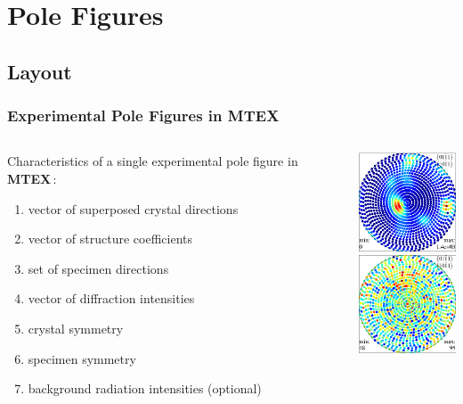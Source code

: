 \documentclass{beamer}
\newcommand{\mtex}{{\large \bf{\color{red}M}TEX\,}}%
\newcommand{\MTEX}{{\bf {\color{red}M}TEX\,}}%
\begin{document}
\section{Pole Figures}

\subsection*{Layout}

\begin{frame}[fragile]
  \frametitle{Experimental Pole Figures in \MTEX}

  \begin{columns}

    \begin{column}{8.2cm}

      Characteristics of a single experimental pole figure in \mtex:
      \begin{enumerate}
      \item vector of superposed crystal directions
      \item vector of structure coefficients
      \item set of specimen directions
      \item vector of diffraction intensities
      \item crystal symmetry
      \item specimen symmetry
      \item background radiation intensities (optional)
      \end{enumerate}

    \end{column}

    \begin{column}{3cm}
      \includegraphics[width=3cm]{pic/pf1}\\
      \includegraphics[width=3cm]{pic/pfso9_bg}
    \end{column}


  \end{columns}


\end{frame}
\end{document}
